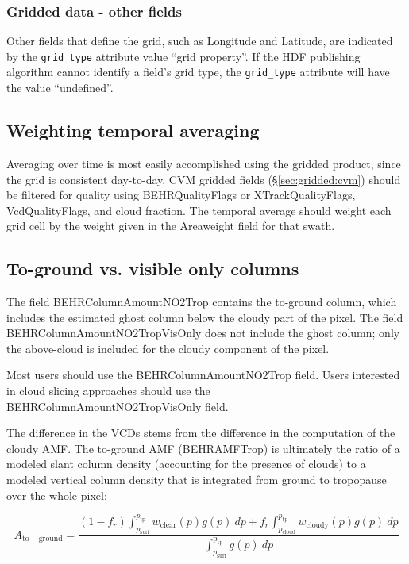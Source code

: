 \documentclass[12pt]{article}
\begin{document}
	\subsubsection{Gridded data - other fields}
	Other fields that define the grid, such as Longitude and Latitude, are indicated by the \lstinline$grid_type$ attribute value ``grid property''. If the HDF publishing algorithm cannot identify a field's grid type, the \lstinline$grid_type$ attribute will have the value ``undefined''.
	
	\subsection{Weighting temporal averaging}\label{sec:temporal-averaging}
	Averaging over time is most easily accomplished using the gridded product, since the grid is consistent day-to-day. CVM gridded fields (\S\ref{sec:gridded:cvm}) should be filtered for quality using BEHRQualityFlags or XTrackQualityFlags, VcdQualityFlags, and cloud fraction. The temporal average should weight each grid cell by the weight given in the Areaweight field for that swath.
	
	
	\subsection{To-ground vs. visible only columns}
	The field BEHRColumnAmountNO2Trop contains the to-ground column, which includes the estimated ghost column below the cloudy part of the pixel. The field BEHRColumnAmountNO2TropVisOnly does not include the ghost column; only the above-cloud  is included for the cloudy component of the pixel.
	
	Most users should use the BEHRColumnAmountNO2Trop field. Users interested in cloud slicing approaches should use the BEHRColumnAmountNO2TropVisOnly field. 
	
	The difference in the VCDs stems from the difference in the computation of the cloudy AMF. The to-ground AMF (BEHRAMFTrop) is ultimately the ratio of a modeled slant column density (accounting for the presence of clouds) to a modeled vertical column density that is integrated from ground to tropopause over the whole pixel:
	
	\begin{equation}\label{eqn:total-amf}
	A_{\mathrm{to-ground}} = \frac{(1-f_r) \int_{p_{\mathrm{surf}}}^{p_{\mathrm{tp}}} w_{\mathrm{clear}}(p) g(p) \: dp + f_r \int_{p_{\mathrm{cloud}}}^{p_{\mathrm{tp}}} w_{\mathrm{cloudy}}(p) g(p) \: dp}{\int_{p_{\mathrm{surf}}}^{\mathrm{p_{tp}}} g(p) \: dp}
	\end{equation}
	
\end{document}
